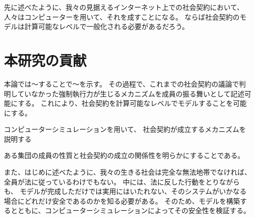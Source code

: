   先に述べたように、我々の見据えるインターネット上での社会契約において、
  人々はコンピューターを用いて、それを成すことになる。
  ならば社会契約のモデルは計算可能なレベルで一般化される必要があるだろう。



  \section{本研究の貢献}
  本論では〜することで〜を示す。
  その過程で、これまでの社会契約の議論で判明していなかった強制執行力が生じるメカニズムを成員の振る舞いとして記述可能にする。
  これにより、社会契約を計算可能なレベルでモデルすることを可能にする。

  
  コンピューターシミュレーションを用いて、
  社会契約が成立するメカニズムを説明する

  ある集団の成員の性質と社会契約の成立の関係性を明らかにすることである。

  また、はじめに述べたように、我々の生きる社会は完全な無法地帯でなければ、全員が法に従っているわけでもない。
  中には、法に反した行動をとりながらも、
  モデルが完成しただけでは実用にはいたれない、そのシステムがいかなる場合にどれだけ安全であるのかを知る必要がある。
  そのため、モデルを構築するとともに、コンピューターシミュレーションによってその安全性を検証する。

  
